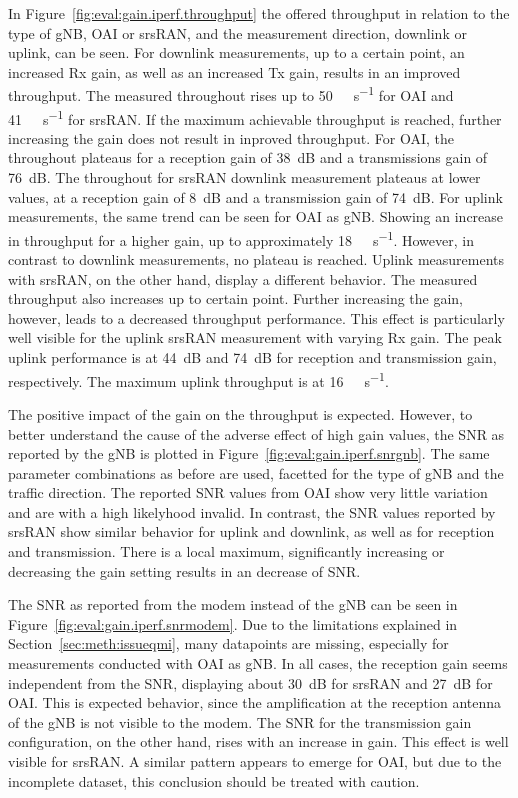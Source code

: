 In Figure~\ref{fig:eval:gain.iperf.throughput} the offered throughput in relation to the type of \gls{gNB},
OAI or srsRAN, and the measurement direction, downlink or uplink, can be seen.
For downlink measurements, up to a certain point, an increased Rx gain, as well as an increased Tx gain, results
in an improved throughput.
The measured throughout rises up to \SI{50}{\mega\bit\per\second} for \gls{OAI} and \SI{41}{\mega\bit\per\second} for srsRAN.
If the maximum achievable throughput is reached, further increasing the gain does not result in inproved throughput.
For \gls{OAI}, the throughout plateaus for a reception gain of \SI{38}{\deci\bel} and a transmissions gain of \SI{76}{\deci\bel}.
The throughout for srsRAN downlink measurement plateaus at lower values, at a reception gain
of \SI{8}{\deci\bel} and a transmission gain of \SI{74}{\deci\bel}.
For uplink measurements, the same trend can be seen for OAI as \gls{gNB}.
Showing an increase in throughput for a higher gain, up to approximately \SI{18}{\mega\bit\per\second}.
However, in contrast to downlink measurements, no plateau is reached.
Uplink measurements with srsRAN, on the other hand, display a different behavior.
The measured throughput also increases up to certain point.
Further increasing the gain, however, leads to a decreased throughput performance.
This effect is particularly well visible for the uplink srsRAN measurement with varying Rx gain.
The peak uplink performance is at \SI{44}{\deci\bel} and \SI{74}{\deci\bel} for reception and transmission gain, respectively.
The maximum uplink throughput is at \SI{16}{\mega\bit\per\second}.

The positive impact of the gain on the throughput is expected.
However, to better understand the cause of the adverse effect of high gain values, the \gls{SNR} as reported by the \gls{gNB} is plotted in
Figure~\ref{fig:eval:gain.iperf.snrgnb}.
The same parameter combinations as before are used, facetted for the type of \gls{gNB} and the traffic direction.
The reported \gls{SNR} values from OAI show very little variation and are with a high likelyhood invalid.
In contrast, the \gls{SNR} values reported by srsRAN show similar behavior for uplink and downlink, as well as for reception and transmission.
There is a local maximum, significantly increasing or decreasing the gain setting results in an decrease of \gls{SNR}.

The \gls{SNR} as reported from the modem instead of the \gls{gNB} can be seen in Figure~\ref{fig:eval:gain.iperf.snrmodem}.
Due to the limitations explained in Section~\ref{sec:meth:issueqmi}, many datapoints are missing,
especially for measurements conducted with \gls{OAI} as \gls{gNB}.
In all cases, the reception gain seems independent from the \gls{SNR}, displaying about \SI{30}{\deci\bel} for srsRAN and \SI{27}{\deci\bel} for OAI.
This is expected behavior, since the amplification at the reception antenna of the \gls{gNB} is not visible to the modem.
The \gls{SNR} for the transmission gain configuration, on the other hand, rises with an increase in gain.
This effect is well visible for srsRAN.
A similar pattern appears to emerge for \gls{OAI}, but due to the incomplete dataset, this conclusion should be treated with caution.

